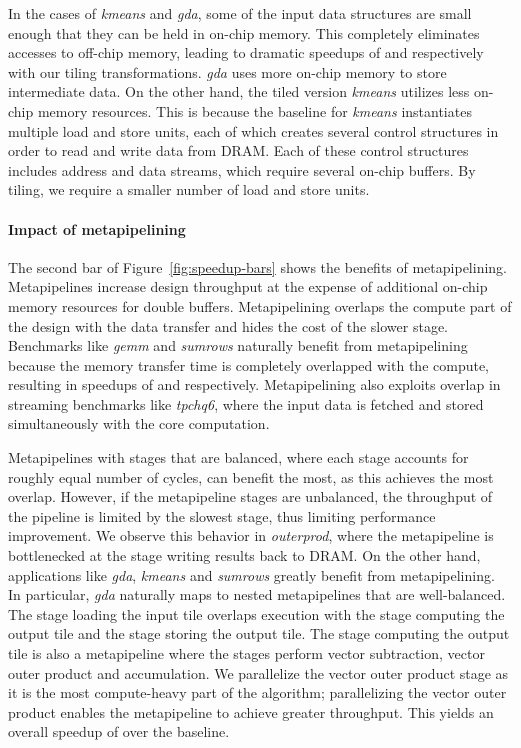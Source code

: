\documentclass[pageno]{jpaper}
\begin{document}
In the cases of \emph{kmeans} and \emph{gda}, some
of the input data structures are small enough that they can be held in on-chip memory. This completely
eliminates accesses to off-chip memory, leading to dramatic speedups of  and  respectively
with our tiling transformations. \emph{gda} uses more on-chip memory to store intermediate data. On the other hand, the tiled
version \emph{kmeans} utilizes less on-chip memory resources. This is because the baseline for \emph{kmeans} instantiates multiple
load and store units, each of which creates several control structures in order to read and write data from DRAM. Each of these control
structures includes address and data streams, which require several on-chip buffers. By tiling, we require a smaller number of load and
store units.

\paragraph{Impact of metapipelining}
The second bar of Figure~\ref{fig:speedup-bars} shows the benefits of metapipelining. Metapipelines increase design throughput
at the expense of additional on-chip memory resources for double buffers.
Metapipelining overlaps the compute part of the design with the data transfer and hides the cost of the slower stage. Benchmarks like
\emph{gemm} and \emph{sumrows} naturally benefit from metapipelining because the memory transfer time is completely overlapped
with the compute, resulting in speedups of  and  respectively. Metapipelining also exploits overlap in
streaming benchmarks like \emph{tpchq6}, where the input data is fetched and stored simultaneously with the core computation.

Metapipelines with stages that are balanced, where each stage accounts for roughly equal number of cycles,
can benefit the most, as this achieves the most overlap. However, if the metapipeline stages are unbalanced, the throughput of the
pipeline is limited by the slowest stage, thus limiting performance improvement. We observe this behavior in \emph{outerprod},
where the metapipeline is bottlenecked at the stage writing results back to DRAM. On the other hand, applications
like \emph{gda}, \emph{kmeans} and \emph{sumrows} greatly benefit from metapipelining. In particular, \emph{gda} naturally
maps to nested metapipelines that are well-balanced. The stage loading the input tile overlaps execution with the stage
computing the output tile and the stage storing the output tile. The stage computing the output tile is also
a metapipeline where the stages perform vector subtraction, vector outer product and accumulation. We parallelize the vector
outer product stage as it is the most compute-heavy part of the algorithm; parallelizing the vector outer product enables
the metapipeline to achieve greater throughput. This yields an overall speedup of 
over the baseline.
\end{document}
